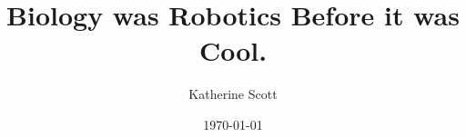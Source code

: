 \documentclass[compress]{beamer}
\title[RobotWords]{Biology was Robotics Before it was Cool.} %
\author{Katherine Scott} %
\institute[Computer Vision Engineer] %
{
Computer Vision Engineer
\medskip
\textit{katherine.a.scott@gmail.com}
\textit{http://www.kscottz.com}
}
\date{\today} %
\begin{document}
\begin{frame}
\titlepage %
\end{frame}



\end{document}

